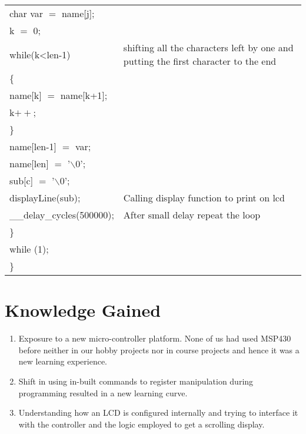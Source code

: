 \documentclass[12pt, letterpaper]{article}
\begin{document}
\begin{longtable}{|p{6cm}||p{5cm}|}
                
 
             \hspace{0.1cm}   char var $=$ name[j]; & \\
             \hspace{0.1cm}   k $=$ 0; & \\
              \hspace{0.1cm}  while(k<len-1) & shifting all the characters left by one and putting the first character to the end \\
             \hspace{0.3cm}   \{ & \\
              \hspace{0.5cm}          name[k] $=$ name[k+1]; & \\
              \hspace{0.5cm}         k$++$; & \\
               \hspace{0.1cm} \} & \\
                \hspace{0.1cm} name[len-1] $=$ var; & \\
               \hspace{0.1cm}  name[len] $=$ '$\backslash$0'; & \\
              \hspace{0.1cm}  sub[c] $=$ '$\backslash$0'; & \\
             \hspace{0.1cm}   displayLine(sub); & Calling display function to print on lcd\\
             \hspace{0.1cm}   \_\_delay\_cycles(500000); & After small delay repeat the loop\\


        \} & \\


        while (1); & \\
\} & \\

\end{longtable}

\section{Knowledge Gained}

\begin{enumerate}
    \item Exposure to a new micro-controller platform. None of us had used MSP430 before neither in our hobby projects nor in course projects and hence it was a new learning experience.
    \item Shift in using in-built commands to register manipulation during programming resulted in a new learning curve.
    \item Understanding how an LCD is configured internally and trying to interface it with the controller and the logic employed to get a scrolling display.
    \end{enumerate}
\end{document}
